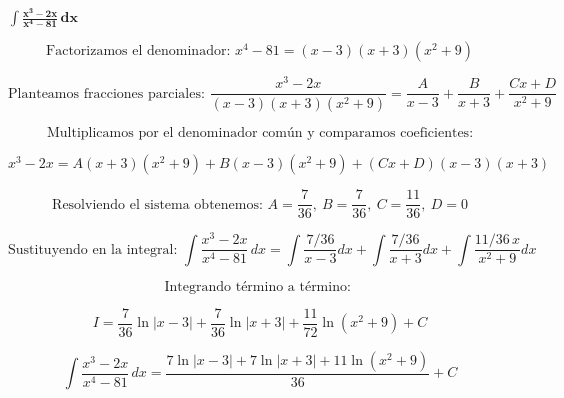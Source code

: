 $\displaystyle \mathbf{\int \frac{x^{3} - 2x}{x^{4} - 81}\,dx}$

\nopagebreak
\[
\text{Factorizamos el denominador: } x^{4} - 81 = (x - 3)(x + 3)(x^{2} + 9)
\]

\[
\text{Planteamos fracciones parciales: }
\frac{x^{3} - 2x}{(x - 3)(x + 3)(x^{2} + 9)}
= \frac{A}{x - 3} + \frac{B}{x + 3} + \frac{Cx + D}{x^{2} + 9}
\]

\[
\text{Multiplicamos por el denominador común y comparamos coeficientes:}
\]

\[
x^{3} - 2x = A(x + 3)(x^{2} + 9) + B(x - 3)(x^{2} + 9) + (Cx + D)(x - 3)(x + 3)
\]

\[
\text{Resolviendo el sistema obtenemos: } A = \frac{7}{36}, \ B = \frac{7}{36}, \ C = \frac{11}{36}, \ D = 0
\]

\[
\text{Sustituyendo en la integral: }
\int \frac{x^{3} - 2x}{x^{4} - 81}\,dx
= \int \frac{7/36}{x - 3} dx + \int \frac{7/36}{x + 3} dx + \int \frac{11/36\, x}{x^{2} + 9} dx
\]

\[
\text{Integrando término a término: }
\]

\[
I = \frac{7}{36}\ln|x - 3| + \frac{7}{36}\ln|x + 3| + \frac{11}{72}\ln(x^{2} + 9) + C
\]

\[
\boxed{\displaystyle
\int \frac{x^{3} - 2x}{x^{4} - 81}\,dx
= \frac{7\ln|x - 3| + 7\ln|x + 3| + 11\ln(x^{2} + 9)}{36} + C
}
\]
